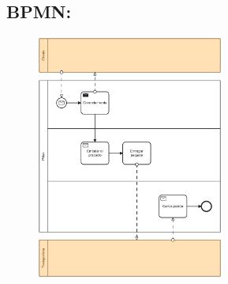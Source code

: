 \documentclass{templateApunte}
\begin{document}
\subsection{BPMN:}
\begin{figure}[H]
  \centering
  \includegraphics[width=0.55\textwidth]{img/Pillan.png}
\end{figure}
\end{document}
